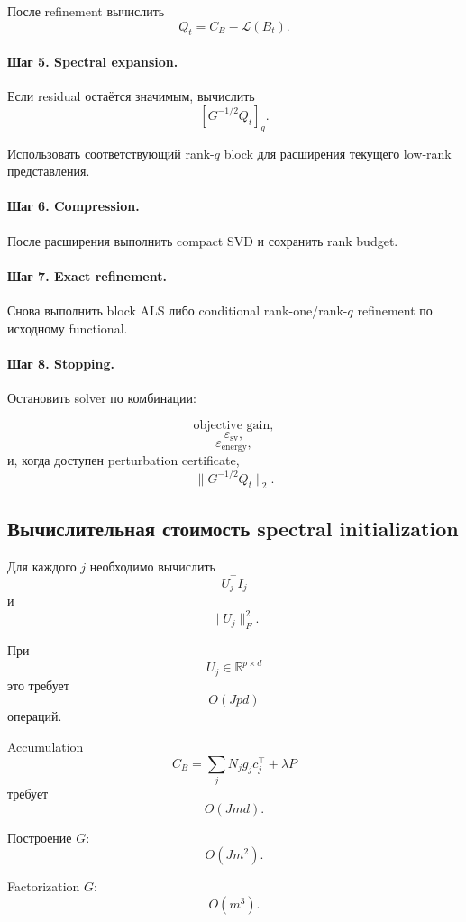 После refinement вычислить
\[
    Q_t
    =
    C_B-\mathcal L(B_t).
\]

\paragraph{Шаг 5. Spectral expansion.}

Если residual остаётся значимым,
вычислить
\[
    [G^{-1/2}Q_t]_q.
\]

Использовать соответствующий rank-$q$ block
для расширения текущего low-rank представления.

\paragraph{Шаг 6. Compression.}

После расширения выполнить compact SVD и сохранить rank budget.

\paragraph{Шаг 7. Exact refinement.}

Снова выполнить block ALS либо conditional
rank-one/rank-$q$ refinement по исходному functional.

\paragraph{Шаг 8. Stopping.}

Остановить solver по комбинации:

\[
    \text{objective gain},
\]
\[
    \varepsilon_{\mathrm{sv}},
\]
\[
    \varepsilon_{\mathrm{energy}},
\]
и, когда доступен perturbation certificate,
\[
    \|G^{-1/2}Q_t\|_2.
\]

\subsection{Вычислительная стоимость spectral initialization}

Для каждого $j$ необходимо вычислить
\[
    U_j^\top I_j
\]
и
\[
    \|U_j\|_F^2.
\]

При
\[
    U_j\in\mathbb R^{p\times d}
\]
это требует
\[
\boxed{
    O(Jpd)
}
\]
операций.

Accumulation
\[
    C_B
    =
    \sum_jN_jg_jc_j^\top+\lambda P
\]
требует
\[
    O(Jmd).
\]

Построение $G$:
\[
    O(Jm^2).
\]

Factorization $G$:
\[
    O(m^3).
\]

